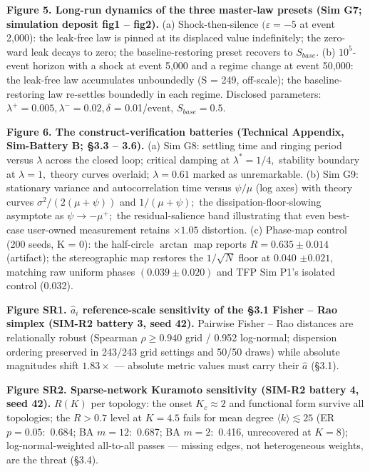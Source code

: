 \documentclass[11pt,twocolumn]{article}
\theoremstyle{gttdef}
\theoremstyle{gttplain}
\begin{document}
\textbf{Figure 5. Long-run dynamics of the three master-law presets (Sim G7; simulation deposit fig1 -- fig2).} (a) Shock-then-silence $(\varepsilon = -5$ at event 2,000): the leak-free law is pinned at its displaced value indefinitely; the zero-ward leak decays to zero; the baseline-restoring preset recovers to $S_{base}.$ (b) $10^{5}$-event horizon with a shock at event 5,000 and a regime change at event 50,000: the leak-free law accumulates unboundedly (S = 249, off-scale); the baseline-restoring law re-settles boundedly in each regime. Disclosed parameters: $\lambda^{+} = 0.005, \lambda^{-} = 0.02, \delta$ = 0.01/event, $S_{base} = 0.5.$

\textbf{Figure 6. The construct-verification batteries (Technical Appendix, Sim-Battery B; \S{}3.3 -- 3.6).} (a) Sim G8: settling time and ringing period versus $\lambda$ across the closed loop; critical damping at $\lambda^{*} = 1/4,$ stability boundary at $\lambda = 1,$ theory curves overlaid; $\lambda = 0.61$ marked as unremarkable. (b) Sim G9: stationary variance and autocorrelation time versus $\psi/\mu$ (log axes) with theory curves $\sigma^{2}/(2(\mu+\psi))$ and $1/(\mu+\psi);$ the dissipation-floor-slowing asymptote as $\psi \to -\mu^{+};$ the residual-salience band illustrating that even best-case user-owned measurement retains $\times1.05$ distortion. (c) Phase-map control (200 seeds, K = 0): the half-circle $\arctan$ map reports $R = 0.635 \pm 0.014$ (artifact); the stereographic map restores the $1/\sqrt{N}$ floor at 0.040 $\pm 0.021,$ matching raw uniform phases $(0.039 \pm 0.020)$ and TFP Sim P1's isolated control (0.032).

\textbf{Figure SR1. $\hat{a}_i$ reference-scale sensitivity of the \S{}3.1 Fisher -- Rao simplex (SIM-R2 battery 3, seed 42).} Pairwise Fisher -- Rao distances are relationally robust (Spearman $\rho \geq 0.940$ grid / 0.952 log-normal; dispersion ordering preserved in 243/243 grid settings and 50/50 draws) while absolute magnitudes shift $1.83\times$ --- absolute metric values must carry their $\hat{a}$ (\S{}3.1).

\textbf{Figure SR2. Sparse-network Kuramoto sensitivity (SIM-R2 battery 4, seed 42).} $R(K)$ per topology: the onset $K_c \approx 2$ and functional form survive all topologies; the $R > 0.7$ level at $K = 4.5$ fails for mean degree $\langle k\rangle \lesssim 25$ (ER $p = 0.05:$ 0.684; BA $m = 12:$ 0.687; BA $m = 2:$ 0.416, unrecovered at $K = 8$); log-normal-weighted all-to-all passes --- missing edges, not heterogeneous weights, are the threat (\S{}3.4).
\end{document}
